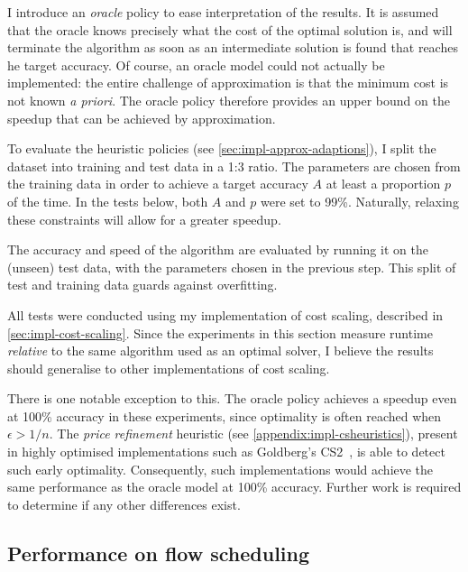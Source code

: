 I introduce an \emph{oracle} policy to ease interpretation of the results. It is assumed that the oracle knows precisely what the cost of the optimal solution is, and will terminate the algorithm as soon as an intermediate solution is found that reaches he target accuracy. Of course, an oracle model could not actually be implemented: the entire challenge of approximation is that the minimum cost is not known \textit{a priori}. The oracle policy therefore provides an upper bound on the speedup that can be achieved by approximation.

To evaluate the heuristic policies (see \cref{sec:impl-approx-adaptions}), I split the dataset into training and test data in a 1:3 ratio. The parameters are chosen from the training data in order to achieve a target accuracy $A$ at least a proportion $p$ of the time. In the tests below, both $A$ and $p$ were set to 99\%. Naturally, relaxing these constraints will allow for a greater speedup.

The accuracy and speed of the algorithm are evaluated by running it on the (unseen) test data, with the parameters chosen in the previous step. This split of test and training data guards against overfitting.

All tests were conducted using my implementation of cost scaling, described in \cref{sec:impl-cost-scaling}. Since the experiments in this section measure runtime \emph{relative} to the same algorithm used as an optimal solver, I believe the results should generalise to other implementations of cost scaling. 

There is one notable exception to this. The oracle policy achieves a speedup even at 100\% accuracy in these experiments, since optimality is often reached when $\epsilon > 1/n$. The \emph{price refinement} heuristic (see \cref{appendix:impl-csheuristics}), present in highly optimised implementations such as Goldberg's CS2~\cite{CS2:2009}, is able to detect such early optimality. Consequently, such implementations would achieve the same performance as the oracle model at 100\% accuracy. Further work is required to determine if any other differences exist.


\subsection{Performance on flow scheduling}

